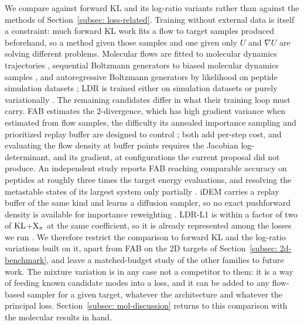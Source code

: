 \documentclass{article}
\begin{document}
{\color{blue}We compare against forward KL and its log-ratio variants rather than against the methods of Section~\ref{subsec: loss-related}. Training without external data is itself a constraint: much forward KL work fits a flow to target samples produced beforehand, so a method given those samples and one given only $U$ and $\nabla U$ are solving different problems. Molecular flows are fitted to molecular dynamics trajectories \citep{klein2023equivariant,klein2024transferable}, sequential Boltzmann generators to biased molecular dynamics samples \citep{tan2025sequential}, and autoregressive Boltzmann generators by likelihood on peptide simulation datasets \citep{rehman2026autoregressive}; LDR is trained either on simulation datasets or purely variationally \citep{schopmans2026ldr}. The remaining candidates differ in what their training loop must carry. FAB estimates the $2$-divergence, which has high gradient variance when estimated from flow samples, the difficulty its annealed importance sampling and prioritized replay buffer are designed to control \citep{midgley2022flow}; both add per-step cost, and evaluating the flow density at buffer points requires the Jacobian log-determinant, and its gradient, at configurations the current proposal did not produce. An independent study reports FAB reaching comparable accuracy on peptides at roughly three times the target energy evaluations, and resolving the metastable states of its largest system only partially \citep{schopmans2025temperature}. iDEM carries a replay buffer of the same kind and learns a diffusion sampler, so no exact pushforward density is available for importance reweighting \citep{akhound2024iterated}. LDR-L1 is within a factor of two of $\mathrm{KL}$+$\mathrm{X}_\pi$ at the same coefficient, so it is already represented among the losses we run \citep{schopmans2026ldr}. We therefore restrict the comparison to forward KL and the log-ratio variations built on it, apart from FAB on the 2D targets of Section~\ref{subsec: 2d-benchmark}, and leave a matched-budget study of the other families to future work. The mixture variation is in any case not a competitor to them: it is a way of feeding known candidate modes into a loss, and it can be added to any flow-based sampler for a given target, whatever the architecture and whatever the principal loss. Section~\ref{subsec: mol-discussion} returns to this comparison with the molecular results in hand.}
\end{document}
